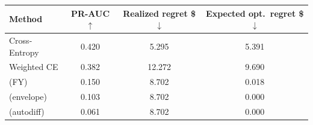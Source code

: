 \begin{tabular}{lccc}
\toprule
\textbf{Method} & \textbf{PR-AUC $\uparrow$} & \textbf{Realized regret \$ $\downarrow$} & \textbf{Expected opt.\ regret \$ $\downarrow$} \\
\midrule
Cross-Entropy & 0.420 & 5.295 & 5.391 \\
Weighted CE & 0.382 & 12.272 & 9.690 \\
\CACIS{} (FY) & 0.150 & 8.702 & 0.018 \\
\CACIS{} (envelope) & 0.103 & 8.702 & 0.000 \\
\CACIS{} (autodiff) & 0.061 & 8.702 & 0.000 \\
\bottomrule
\end{tabular}
